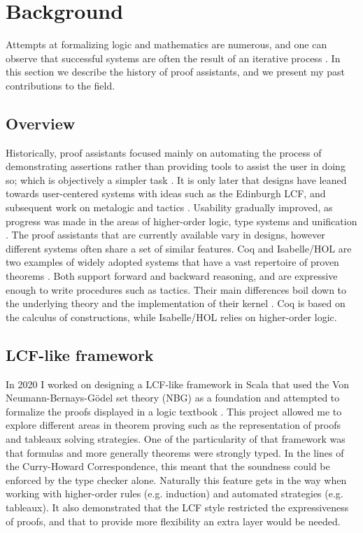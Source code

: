 \section{Background}
\label{sec:background}

Attempts at formalizing logic and mathematics are numerous, and one can observe that successful systems are often the result of an iterative process \cite{Paulson2019, Harrison2014, Asperti2007}. In this section we describe the history of proof assistants, and we present my past contributions to the field.

\subsection{Overview}

Historically, proof assistants focused mainly on automating the process of demonstrating assertions rather than providing tools to assist the user in doing so; which is objectively a simpler task \cite{Harrison2014}. It is only later that designs have leaned towards user-centered systems with ideas such as the Edinburgh LCF, and subsequent work on metalogic and tactics \cite{Milner1984}. Usability gradually improved, as progress was made in the areas of higher-order logic, type systems and unification \cite{Paulson2019}. The proof assistants that are currently available vary in designs, however different systems often share a set of similar features. Coq and Isabelle/HOL are two examples of widely adopted systems that have a vast repertoire of proven theorems \cite{Yushkovskiy2018}. Both support forward and backward reasoning, and are expressive enough to write procedures such as tactics. Their main differences boil down to the underlying theory and the implementation of their kernel \cite{Barras1999, Wenzel2021}. Coq is based on the calculus of constructions, while Isabelle/HOL relies on higher-order logic.

\subsection{LCF-like framework}

In 2020 I worked on designing a LCF-like framework in Scala that used the Von Neumann-Bernays-Gödel set theory (NBG) as a foundation \cite{Cassayre2020} and attempted to formalize the proofs displayed in a logic textbook \cite{Mendelson2015}. This project allowed me to explore different areas in theorem proving such as the representation of proofs and tableaux solving strategies. One of the particularity of that framework was that formulas and more generally theorems were strongly typed. In the lines of the Curry-Howard Correspondence, this meant that the soundness could be enforced by the type checker alone. Naturally this feature gets in the way when working with higher-order rules (e.g. induction) and automated strategies (e.g. tableaux). It also demonstrated that the LCF style restricted the expressiveness of proofs, and that to provide more flexibility an extra layer would be needed.

